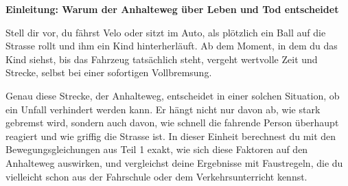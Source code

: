 \documentclass[addpoints,11pt,a4paper]{exam}
\newenvironment{beispielbox}[1][Beispiel]{%
  \par\addvspace{10pt}\noindent\textbf{#1}\par\smallskip\noindent
}{%
  \par\addvspace{10pt}
}
\begin{document}
\begin{beispielbox}[Einleitung: Warum der Anhalteweg über Leben und Tod entscheidet]
Stell dir vor, du fährst Velo oder sitzt im Auto, als plötzlich ein Ball
auf die Strasse rollt und ihm ein Kind hinterherläuft. Ab dem Moment, in
dem du das Kind siehst, bis das Fahrzeug tatsächlich steht, vergeht
wertvolle Zeit und Strecke, selbst bei einer sofortigen Vollbremsung.

Genau diese Strecke, der Anhalteweg, entscheidet in einer solchen
Situation, ob ein Unfall verhindert werden kann. Er hängt nicht nur davon
ab, wie stark gebremst wird, sondern auch davon, wie schnell die fahrende
Person überhaupt reagiert und wie griffig die Strasse ist. In dieser
Einheit berechnest du mit den Bewegungsgleichungen aus Teil 1 exakt, wie
sich diese Faktoren auf den Anhalteweg auswirken, und vergleichst deine
Ergebnisse mit Faustregeln, die du vielleicht schon aus der Fahrschule
oder dem Verkehrsunterricht kennst.
\end{beispielbox}
\end{document}
